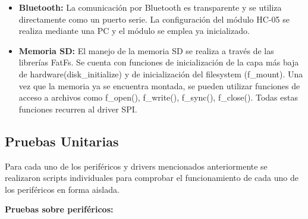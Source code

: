 \begin{itemize}
 	
 	\item \textbf{Bluetooth:} La comunicación por Bluetooth es transparente y se utiliza directamente como un puerto serie. La configuración del módulo HC-05 se realiza mediante una PC y el módulo se emplea ya inicializado.

	\item \textbf{Memoria SD:} El manejo de la memoria SD se realiza a través de las librerías FatFs. Se cuenta con funciones de inicialización de la capa más baja de hardware(disk\_initialize) y de inicialización del filesystem (f\_mount). Una vez que la memoria ya se encuentra montada, se pueden utilizar funciones de acceso a archivos como f\_open(), f\_write(), f\_sync(), f\_close(). Todas estas funciones recurren al driver SPI.

\end{itemize}

\subsection{Pruebas Unitarias} \label{pruebasUnitarias}


Para cada uno de los periféricos y drivers mencionados anteriormente se realizaron scripts individuales para comprobar el funcionamiento de cada uno de los periféricos en forma aislada.

\textbf{Pruebas sobre periféricos:}

